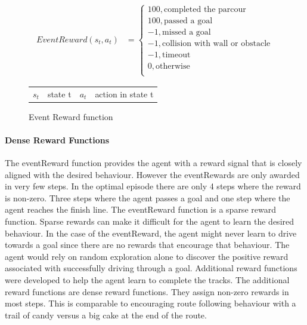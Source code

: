 \begin{figure}
    \centering
    \begin{align}
        EventReward(s_t, a_t) & = \begin{cases}
                                      100,           \text{completed the parcour}           \\
                                      100,             \text{passed a goal}                 \\
                                      -1,            \text{missed a goal}                   \\
                                      -1,            \text{collision with wall or obstacle} \\
                                      -1,            \text{timeout}                         \\
                                      0,             \text{otherwise}                       \\
                                  \end{cases} \nonumber
    \end{align}
    \caption{Event Reward function}
    \begin{tabular}{r@{: }l r@{: }l}
        $s_t$ & state t & $a_t$ & action in state t
    \end{tabular}
    \label{fig:eventReward_function}
\end{figure}


\paragraph*{Dense Reward Functions}
The eventReward function provides the agent with a reward signal that is closely aligned with the desired behaviour. However the eventRewards are only awarded in very few steps. In the optimal episode there are only 4 steps where the reward is non-zero. Three steps where the agent passes a goal and one step where the agent reaches the finish line. The eventReward function is a sparse reward function. Sparse rewards can make it difficult for the agent to learn the desired behaviour. In the case of the eventReward, the agent might never learn to drive towards a goal since there are no rewards that encourage that behaviour. The agent would rely on random exploration alone to discover the positive reward associated with successfully driving through a goal.
Additional reward functions were developed to help the agent learn to complete the tracks. The additional reward functions are dense reward functions. They assign non-zero rewards in most steps. This is comparable to encouraging route following behaviour with a trail of candy versus a big cake at the end of the route.


